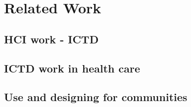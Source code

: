 \section{Related Work}
\begin{comment}
There are two, or three ways to do this. The first is to not do a RW section at all. In this case, you let the data/analysis connect with prior work as you go along. It would be nice if this could be sufficient but most often it is not. Further, people expect a section on prior work so you make it easier for reviewers to understand which body of work you are drawing on and extending.
 And yes, always draw on and extend. You want to contribute to a body of knowledge that already exists, because together as academics, that is our goal. However, you also want to extend that body of knowledge (otherwise why write this paper?). 
The second way to do this is to break RW down into subsections that are like circles in a venn diagram. Your research falls into the intersection of those circles. They may or may not intersect at multiple points. The important thing is to cover every paper that has a leaning/focus similar to yours. So you could do -- “Our paper builds on XYZ work. Here’s X and here’s how we extend it. Here’s Y and …”
The third (and slightly more preferable way, according to me) is to make the related work section flow instead of have it broken down into these discrete sections like I just mentioned. Tell it like a story, not like a list of papers. Make it seem thoughtful and nuanced, instead of a “1, 2, 3” listing. 
You can look at the Mobile Phones for Maternal Health in Rural India paper that I wrote for CHI 2015 as an example. It is by no means the best way to do this, but it did not raise any eyebrows in the review process, at least. One subsection (or 2-3 paragraphs) could be dedicated just to the theoretical lens, if you are using one.
\end{comment}
\textcolor{red}{}
\subsection{HCI work - ICTD}
\subsection{ICTD work in health care}
\subsection{Use and designing for communities}

